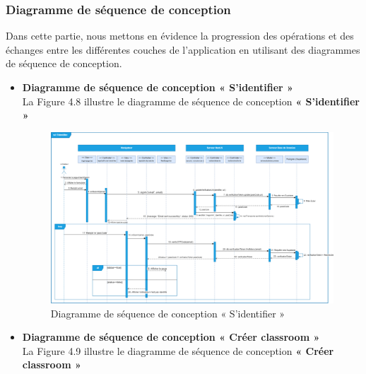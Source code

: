 \subsubsection{Diagramme de séquence de conception}
\justifying
Dans cette partie, nous mettons en évidence la progression des opérations et des échanges entre les différentes couches de l'application en utilisant des diagrammes de séquence de conception.
\begin{itemize}[itemsep=1pt, parsep=1pt]
    \newpage
    \item \textbf{Diagramme de séquence de conception « S’identifier » }\\
        La Figure 4.8 illustre le diagramme de séquence de conception \textbf{« S’identifier »} 
        \begin{figure}[H]
            \centering
            \includegraphics[width=1.32\textwidth,height=1\textwidth,angle=90]{images/chp4/fig8.png}
            \caption{Diagramme de séquence de conception « S’identifier »}
            \label{fig:Diagramme de séquence de conception « S’identifier »}    
        \end{figure}
    \item \textbf{Diagramme de séquence de conception « Créer classroom » }\\
        La Figure 4.9 illustre le diagramme de séquence de conception \textbf{« Créer classroom »} 

\end{itemize}
